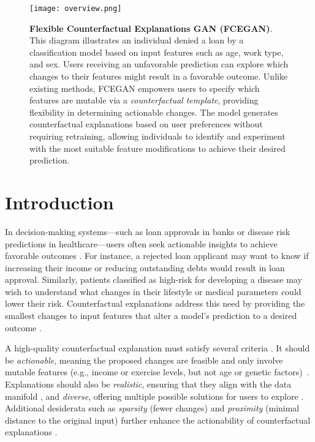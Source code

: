 \documentclass[runningheads]{llncs}
\begin{document}
\begin{figure}[t!]
    \centering
    \texttt{[image: overview.png]}
    \caption{\textbf{Flexible Counterfactual Explanations GAN (FCEGAN)}. This diagram illustrates an individual denied a loan by a classification model based on input features such as age, work type, and sex. Users receiving an unfavorable prediction can explore which changes to their features might result in a favorable outcome. Unlike existing methods, FCEGAN empowers users to specify which features are mutable via a \textit{counterfactual template}, providing flexibility in determining actionable changes. The model generates counterfactual explanations based on user preferences without requiring retraining, allowing individuals to identify and experiment with the most suitable feature modifications to achieve their desired prediction.}
    \label{fig:overview framework}
\end{figure}

\section{Introduction}
\label{sec:intro}
In decision-making systems—such as loan approvals in banks or disease risk predictions in healthcare—users often seek actionable insights to achieve favorable outcomes \cite{tsirtsis2020decisions,grath2018interpretable,verma2020counterfactual,verma2024counterfactual}. For instance, a rejected loan applicant may want to know if increasing their income or reducing outstanding debts would result in loan approval. Similarly, patients classified as high-risk for developing a disease may wish to understand what changes in their lifestyle or medical parameters could lower their risk. Counterfactual explanations address this need by providing the smallest changes to input features that alter a model's prediction to a desired outcome \cite{degrave_2021_ai,mertes_2022_ganterfactual}.

A high-quality counterfactual explanation must satisfy several criteria \cite{wachter_2017_counterfactual}. It should be \textit{actionable}, meaning the proposed changes are feasible and only involve mutable features (e.g., income or exercise levels, but not age or genetic factors)~\cite{poyiadzi2020face,ustun2019actionable}. Explanations should also be \textit{realistic}, ensuring that they align with the data manifold \cite{joshi2019towards,pawelczyk2020learning}, and \textit{diverse}, offering multiple possible solutions for users to explore \cite{mothilal2020explaining}. Additional desiderata such as \textit{sparsity} (fewer changes) and \textit{proximity} (minimal distance to the original input) further enhance the actionability of counterfactual explanations \cite{karimi2021algorithmic}.
\end{document}
